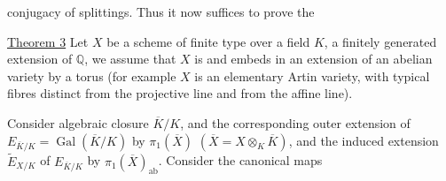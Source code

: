 conjugacy of splittings. Thus it now suffices to prove the

\uline{Theorem 3} Let $X$ be a scheme of finite type over a field $K$, a finitely generated extension of $\mathbb Q$, we assume that $X$ is   and embeds in an extension of an abelian variety by a torus (for example $X$ is an elementary Artin variety, with typical fibres  distinct from the projective line and from the affine line).


Consider   algebraic closure $\overline K/K$, and  the corresponding outer extension  of $E_{\overline K/K}=\operatorname{Gal}(\overline K/K)$ by $\pi_1(\overline X)$ $(\overline X=X\otimes_K\overline K)$, and the induced extension $\widetilde E_{X/K}$ of $E_{\overline K/K}$ by $\pi_1(\overline X)_{\mathrm{ab}}$. Consider the canonical maps
